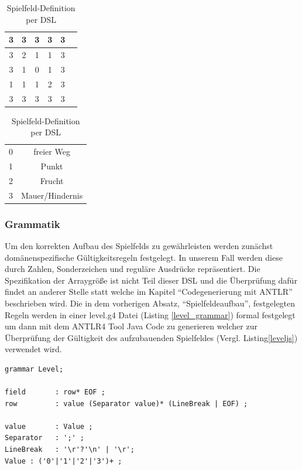 \documentclass[conference]{IEEEtran}
\begin{document}
\begin{table}[!t]
\caption{Spielfeld-Definition per DSL}
\label{gameboard_dsl}
\centering
\begin{tabular}{|c|c|c|c|c|c|}
\hline
3 & 3 & 3 & 3 & 3\\
\hline
3 & 2 & 1 & 1 & 3\\
\hline
3 & 1 & 0 & 1 & 3\\
\hline
1 & 1 & 1 & 2 & 3\\
\hline
3 & 3 & 3 & 3 & 3\\
\hline
\end{tabular}
\begin{tabular}{|c|c|}
0 & freier Weg\\
1 & Punkt\\
2 & Frucht\\
3 & Mauer/Hindernis
\end{tabular}
\end{table}


\subsubsection{Grammatik}
Um den korrekten Aufbau des Spielfelds zu gewährleisten werden zunächst domänenspezifische Gültigkeitsregeln festgelegt. In unserem Fall werden diese durch Zahlen, Sonderzeichen und reguläre Ausdrücke repräsentiert. Die Spezifikation der Arraygröße ist nicht Teil dieser DSL und die Überprüfung dafür findet an anderer Stelle statt welche im Kapitel “Codegenerierung mit ANTLR” beschrieben wird. Die in dem vorherigen Absatz, “Spielfeldeaufbau”, festgelegten Regeln werden in einer level.g4 Datei (Listing \ref{level_grammar}) formal festgelegt um dann mit dem ANTLR4 Tool Java Code zu generieren welcher zur Überprüfung der Gültigkeit des aufzubauenden Spielfeldes (Vergl. Listing\ref{leveljs}) verwendet wird.

\begin{lstlisting}[captionpos=b, caption={Auszug aus der DSL spezifizierenden Grammatik level.g4}, label=level_grammar]
grammar Level;

field       : row* EOF ;
row         : value (Separator value)* (LineBreak | EOF) ;

value       : Value ;
Separator   : ';' ;
LineBreak   : '\r'?'\n' | '\r';
Value : ('0'|'1'|'2'|'3')+ ;
\end{lstlisting}
\end{document}
